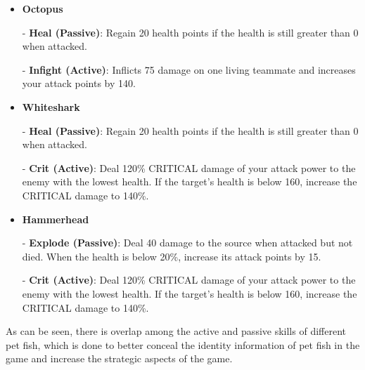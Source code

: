 \begin{itemize}[leftmargin=1.5em,itemsep=0pt,parsep=0.2em,topsep=0.0em,partopsep=0.0em]
    - \textbf{Subtle (Active)}: Choose a teammate or yourself to reduce the damage taken by 70\% when attacked, and increase its attack points by 20.

\item \textbf{Octopus}

    - \textbf{Heal (Passive)}: Regain 20 health points if the health is still greater than 0 when attacked. 
    
    - \textbf{Infight (Active)}: Inflicts 75 damage on one living teammate and increases your attack points by 140.

\item \textbf{Whiteshark}

    - \textbf{Heal (Passive)}: Regain 20 health points if the health is still greater than 0 when attacked.
    
    - \textbf{Crit (Active)}: Deal 120\% CRITICAL damage of your attack power to the enemy with the lowest health. If the target's health is below 160, increase the CRITICAL damage to 140\%. 

\item \textbf{Hammerhead}

    - \textbf{Explode (Passive)}: Deal 40 damage to the source when attacked but not died. When the health is below 20\%, increase its attack points by 15. 
    
    -  \textbf{Crit (Active)}: Deal 120\% CRITICAL damage of your attack power to the enemy with the lowest health. If the target's health is below 160, increase the CRITICAL damage to 140\%. 

\end{itemize}
As can be seen, there is overlap among the active and passive skills of different pet fish, which is done to better conceal the identity information of pet fish in the game and increase the strategic aspects of the game.


